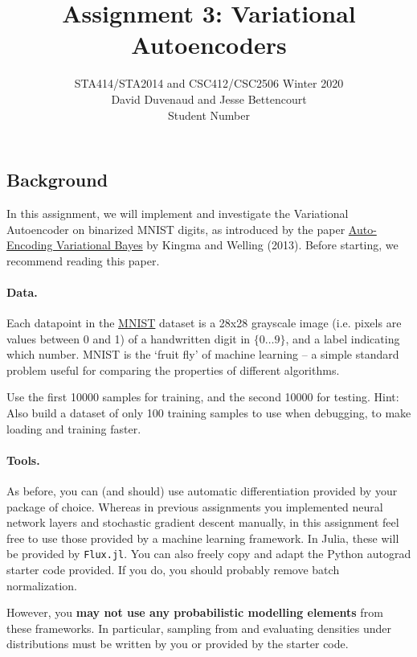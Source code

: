 \documentclass{article}
\begin{document}
\title{Assignment 3: Variational Autoencoders}
\author{STA414/STA2014 and CSC412/CSC2506 Winter 2020\\
  David Duvenaud and Jesse Bettencourt\\
  Student Number
}
\maketitle



\subsection{Background}
In this assignment, we will implement and investigate the Variational Autoencoder on binarized MNIST digits, as introduced by the paper \href{https://arxiv.org/pdf/1312.6114.pdf}{Auto-Encoding Variational Bayes} by Kingma and Welling (2013). Before starting, we recommend reading this paper.

\paragraph{Data.}
Each datapoint in the \href{http://yann.lecun.com/exdb/mnist/}{MNIST} dataset is a 28x28 grayscale image (i.e. pixels are values between 0 and 1) of a handwritten digit in $\{0 \dots 9\}$, and a label indicating which number.
MNIST is the `fruit fly' of machine learning -- a simple standard problem useful for comparing the properties of different algorithms.

Use the first 10000 samples for training, and the second 10000 for testing.
Hint: Also build a dataset of only 100 training samples to use when debugging, to make loading and training faster.

\paragraph{Tools.}
As before, you can (and should) use automatic differentiation provided by your package of choice.
Whereas in previous assignments you implemented neural network layers and stochastic gradient descent manually, in this assignment feel free to use those provided by a machine learning framework.
In Julia, these will be provided by \texttt{Flux.jl}.
You can also freely copy and adapt the Python autograd starter code provided.  
If you do, you should probably remove batch normalization.

However, you \textbf{may not use any probabilistic modelling elements} from these frameworks.
In particular, sampling from and evaluating densities under distributions must be written by you or provided by the starter code.
\end{document}

